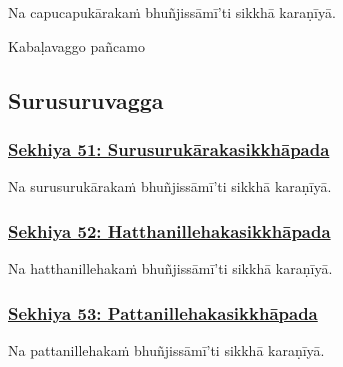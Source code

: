 Na capucapukārakaṁ bhuñjissāmī'ti sikkhā karaṇīyā.

\begin{center}
	Kabaḷavaggo\makeatletter\hyperlink{endnote501-appendix}\makeatother{} pañcamo\makeatletter\hyperlink{endnote502-appendix}\makeatother{}
\end{center}



\subsection{Surusuruvagga}
\label{sekh-vagga6}

\subsubsection*{\hyperref[training51]{Sekhiya 51: Surusurukārakasikkhāpada}}
\label{sekh51}

Na surusurukārakaṁ bhuñjissāmī'ti sikkhā karaṇīyā.



\subsubsection*{\hyperref[training52]{Sekhiya 52: Hatthanillehakasikkhāpada}}
\label{sekh52}

Na hatthanillehakaṁ bhuñjissāmī'ti sikkhā karaṇīyā.



\subsubsection*{\hyperref[training53]{Sekhiya 53: Pattanillehakasikkhāpada}}
\label{sekh53}

Na pattanillehakaṁ bhuñjissāmī'ti sikkhā karaṇīyā.



